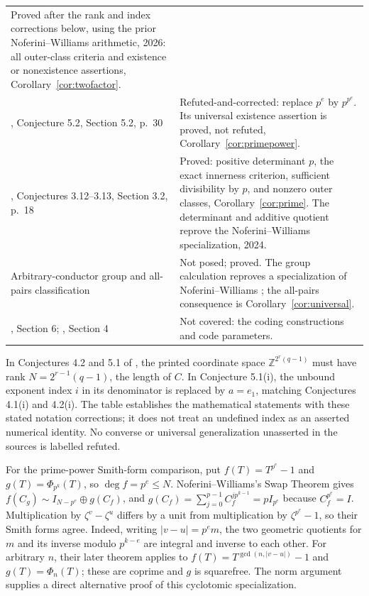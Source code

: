 \documentclass[11pt]{article}
\newcommand{\ZZ}{\mathbb Z}
\begin{document}
\begin{small}
\begin{longtable}{@{}p{.25\linewidth}p{.70\linewidth}@{}}
Proved after the rank and index corrections below, using the prior
Noferini--Williams arithmetic, 2026: all outer-class
criteria and existence or nonexistence assertions,
Corollary~\ref{cor:twofactor}.\\
\cite{MS}, Conjecture 5.2, Section 5.2, p.~30 &
Refuted-and-corrected: replace $p^e$ by $p^{p^e}$.
Its universal existence assertion is proved, not refuted,
Corollary~\ref{cor:primepower}.\\
\cite{MSrings}, Conjectures 3.12--3.13, Section 3.2, p.~18 &
Proved: positive determinant $p$, the exact innerness criterion,
sufficient divisibility by $p$, and nonzero outer classes,
Corollary~\ref{cor:prime}. The determinant and additive quotient
reprove the Noferini--Williams specialization, 2024.\\
Arbitrary-conductor group and all-pairs classification &
Not posed; proved. The group calculation reproves a specialization of
Noferini--Williams \cite{NW24,NW26}; the all-pairs consequence is
Corollary~\ref{cor:universal}.\\
\cite{MS}, Section 6; \cite{MSrings}, Section 4 &
Not covered: the coding constructions and code parameters.\\
\bottomrule
\end{longtable}
\end{small}
In Conjectures 4.2 and 5.1 of \cite{MS}, the printed coordinate space
$\ZZ^{2^r(q-1)}$ must have rank $N=2^{r-1}(q-1)$, the length of $C$.
In Conjecture 5.1(i), the unbound exponent index $i$ in its denominator
is replaced by $a=e_1$, matching Conjectures 4.1(i) and 4.2(i).
The table establishes the mathematical statements with these stated
notation corrections; it does not treat an undefined index as an
asserted numerical identity. No converse or universal generalization
unasserted in the sources is labelled refuted.

For the prime-power Smith-form comparison, put $f(T)=T^{p^e}-1$ and
$g(T)=\Phi_{p^k}(T)$, so $\deg f=p^e\leq N$. Noferini--Williams's Swap Theorem gives
$f(C_g)\sim I_{N-p^e}\oplus g(C_f)$, and
$g(C_f)=\sum_{j=0}^{p-1}C_f^{jp^{k-1}}=pI_{p^e}$ because
$C_f^{p^e}=I$. Multiplication by $\zeta^v-\zeta^u$ differs by a
unit from multiplication by $\zeta^{p^e}-1$, so their Smith forms agree.
Indeed, writing $|v-u|=p^e m$, the two geometric quotients for $m$ and
its inverse modulo $p^{k-e}$ are integral and inverse to each other.
For arbitrary $n$, their later theorem applies to
$f(T)=T^{\gcd(n,|v-u|)}-1$ and $g(T)=\Phi_n(T)$; these are coprime
and $g$ is squarefree. The norm argument supplies a direct alternative
proof of this cyclotomic specialization.
\end{document}
